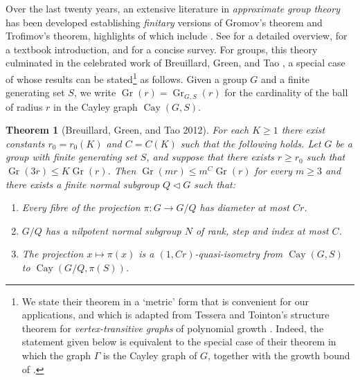 \documentclass[11pt]{article}
\numberwithin{equation}{section}
\theoremstyle{plain}
\newtheorem{thm}{Theorem}[section]
\theoremstyle{definition}
\theoremstyle{remark}
\numberwithin{equation}{section}
\numberwithin{equation}{section}
\newcommand{\Cay}{\operatorname{Cay}}
\newcommand{\Gr}{\operatorname{Gr}}
\begin{document}
\setcounter{section}{1}
Over the last twenty years, an extensive literature in \emph{approximate group theory} has been developed establishing \emph{finitary} versions of Gromov's theorem and Trofimov's theorem, highlights of which include \cite{bgt12,shalom-tao,MR2833482,tt.Trof,MR2827010}. See \cite{breuillard2014brief} for a detailed overview, \cite{MR3971253} for a textbook introduction, and \cite{tointon2020brief} for a concise survey.
For groups, this theory culminated in the celebrated work of Breuillard, Green, and Tao \cite{bgt12}, a special case of whose results can be stated\footnote{We state their theorem in a `metric' form that is convenient for our applications, and which is adapted from Tessera and Tointon's structure theorem for \emph{vertex-transitive graphs} of polynomial growth \cite[Theorem 2.3]{tt.Trof}. Indeed, the statement given below is equivalent to the special case of their theorem in which the graph $\Gamma$ is the Cayley graph of $G$, together with the growth bound of \cite[Corollary 11.9]{bgt12}. 
%
} as follows. Given a group $G$ and a finite generating set $S$, we write $\Gr(r)=\Gr_{G,S}(r)$ for the cardinality of the ball of radius $r$ in the Cayley graph $\Cay(G,S)$.

\begin{thm}[Breuillard, Green, and Tao 2012]
\label{thm:BGT_metric}
For each $K\geq 1$ there exist constants $r_0=r_0(K)$ and $C=C(K)$ such that the following holds. Let $G$ be a group with finite generating set $S$, and suppose that there exists $r \geq r_0$ such that $\Gr(3r) \leq K\Gr(r)$. Then $\Gr(mr) \leq m^C \Gr(r)$ for every $m\geq 3$ and there exists a finite normal subgroup $Q \triangleleft G$ such that:

\begin{enumerate}
    \item Every fibre of the projection $\pi:G \rightarrow G/Q$ has diameter at most $Cr$.
    
    
    \item $G/Q$ has a nilpotent normal subgroup $N$ of rank, step and index at most $C$.
    
    
    
    \item The projection $x\mapsto \pi(x)$ is a $(1,Cr)$-quasi-isometry from $\operatorname{Cay}(G,S)$ to $\operatorname{Cay}(G/Q,\pi(S))$.
\end{enumerate}
\end{thm}
\end{document}
